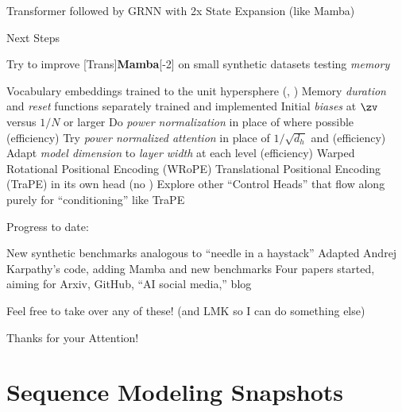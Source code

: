 \begin{slide}[\slideopts,toc={TransMamba}]{Transformer followed by GRNN with 2x State Expansion (like Mamba)}
\end{slide}

\begin{slide}[\slideopts,toc={Plan}]{Next Steps}
  \vspace{-1em}
  \begin{itemize}
    \mpitem Try to improve [Trans]\textbf{Mamba}[-2] on small synthetic datasets testing \emph{memory}
    \begin{itemize}
      \mpitem Vocabulary embeddings trained to the unit hypersphere (\eg, )
      \mpitem Memory \emph{duration} and \emph{reset} functions separately trained and implemented
      \mpitem Initial \emph{biases} at $\zv$ versus $1/N$ or larger
      \mpitem Do \emph{power normalization} in place of  where possible (efficiency)
      \mpitem Try \emph{power normalized attention} in place of $1/\sqrt{d_h}$ and  (efficiency)
      \mpitem Adapt \emph{model dimension} to \emph{layer width} at each level (efficiency)
      \mpitem Warped Rotational Positional Encoding (WRoPE)
      \mpitem Translational Positional Encoding (TraPE) in its own head (no )
      \mpitem Explore other ``Control Heads'' that flow along purely for ``conditioning'' like TraPE
    \end{itemize}
    \mpitem Progress to date:
    \begin{itemize}
      \mpitem New synthetic benchmarks analogous to ``needle in a haystack''
      \mpitem Adapted Andrej Karpathy's  code, adding Mamba and new benchmarks
      \mpitem Four papers started, aiming for Arxiv, GitHub, ``AI social media,'' blog
    \end{itemize}
    \mpitem Feel free to take over any of these! (and LMK so I can do something else)
  \end{itemize}
\end{slide}

\begin{slide}[\slideopts,toc={Hypersphere}]{Thanks for your Attention!}
\vspace{-1em}
\end{slide}

\section[\sectopts,toc={History Samples}]{Sequence Modeling Snapshots}

